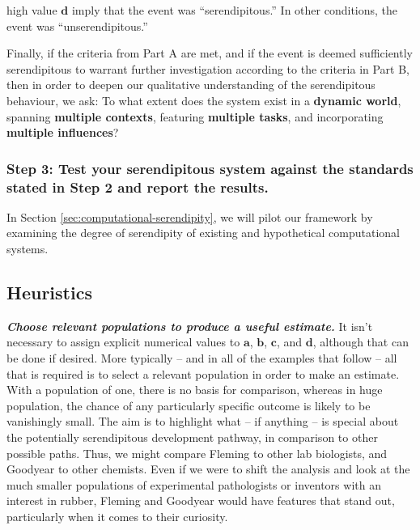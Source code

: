 \begin{description}[itemsep=16pt]
\begin{mdframed}
{  high value $\mathbf{d}$ imply that the event was ``serendipitous.''
  In other conditions, the event was ``unserendipitous.''}
\end{mdframed}
\item[{(\textbf{C - Factors})}] {Finally, if the criteria from Part A
  are met, and if the event is deemed sufficiently serendipitous to
  warrant further investigation according to the criteria in Part B,
  then in order to deepen our qualitative understanding of the
  serendipitous behaviour, we ask: To what extent does the system
  exist in a {\textbf{dynamic world}}, spanning {\textbf{multiple
      contexts}}, featuring {\textbf{multiple tasks}}, and
  incorporating {\textbf{multiple influences}}?}
\end{description}

\subsubsection*{Step 3: Test your serendipitous system against the standards stated in Step 2 and report the results.}

\noindent In Section \ref{sec:computational-serendipity}, we will pilot our framework by examining the degree of serendipity of existing and hypothetical computational systems. 

\subsection{Heuristics}\label{specs-heuristics}

\textbf{\emph{Choose relevant populations to produce a useful
    estimate.}}  It isn't necessary to assign explicit numerical
values to $\mathbf{a}$, $\mathbf{b}$, $\mathbf{c}$, and $\mathbf{d}$,
although that can be done if desired.  More typically -- and in all of
the examples that follow -- all that is required is to select a
relevant population in order to make an estimate.  With a population
of one, there is no basis for comparison, whereas in huge population,
the chance of any particularly specific outcome is likely to be
vanishingly small.  The aim is to highlight what -- if anything -- is
special about the potentially serendipitous development pathway, in
comparison to other possible paths.  Thus, we might compare Fleming to
other lab biologists, and Goodyear to other chemists.  Even if we were
to shift the analysis and look at the much smaller populations of
experimental pathologists or inventors with an interest in rubber,
Fleming and Goodyear would have features that stand out, particularly
when it comes to their curiosity.

